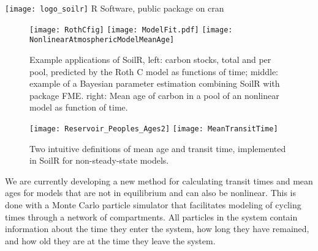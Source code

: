 \documentclass[final,hyperref={pdfpagelabels=false}, professionalmath, mathserif, 11pt]{beamer}
\begin{document}
\begin{frame}
\begin{columns}
\begin{column}{.48\textwidth}
\begin{minipage}[T]{.95\textwidth}
\begin{block}{
	  \texttt{[image: logo\_soilr]} 
	  \hspace{1cm}
	  R Software,
	  public package on cran
	  }
	\begin{figure}
	  \texttt{[image: RothCfig]} \hspace{1cm}
	  \texttt{[image: ModelFit.pdf]}
	  \texttt{[image: NonlinearAtmosphericModelMeanAge]}
	  \caption{
	  Example applications of SoilR, 
	  left: carbon stocks, total and per pool, predicted by the Roth C model as functions of time; 
	   middle: example of a Bayesian parameter estimation combining SoilR with package FME.   
	   right: Mean age of carbon in a pool of an nonlinear model as function of time.
	  }
	\end{figure}
	\begin{figure}
	  \texttt{[image: Reservoir\_Peoples\_Ages2]}
	  \texttt{[image: MeanTransitTime]}
	  \caption{Two intuitive definitions of mean age and transit time, implemented in SoilR for non-steady-state models. }
	\end{figure}
	We are currently developing a new method for calculating transit times and mean ages for models that are not in equilibrium and can also be nonlinear. 
	This is done with a Monte Carlo particle simulator that facilitates modeling of cycling times through a network of compartments. All particles in the system
	contain information about the time they enter the system, how long they have remained, and how old they are at the time they leave the system. 

      \end{block}

    \end{minipage}
  \end{column}
\end{columns}
	\vspace{3ex}
\end{frame}


\end{document}
